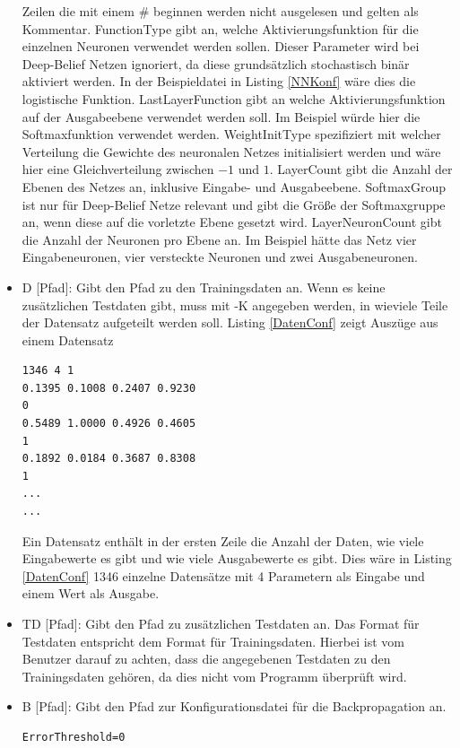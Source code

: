 \documentclass[12pt]{article}
\begin{document}
\begin{itemize}
\begin{lstlisting}[caption={Beispielkonfigurationsdatei für ein neuronales Netz},captionpos=b, label=NNKonf]
\end{lstlisting} 
Zeilen die mit einem \# beginnen werden nicht ausgelesen und gelten als Kommentar. FunctionType gibt an, welche Aktivierungsfunktion für die einzelnen Neuronen verwendet werden sollen. Dieser Parameter wird bei Deep-Belief Netzen ignoriert, da diese grundsätzlich stochastisch binär aktiviert werden. In der Beispieldatei in Listing \ref{NNKonf} wäre dies die logistische Funktion. LastLayerFunction gibt an welche Aktivierungsfunktion auf der Ausgabeebene verwendet werden soll. Im Beispiel würde hier die Softmaxfunktion verwendet werden. WeightInitType spezifiziert mit welcher Verteilung die Gewichte des neuronalen Netzes initialisiert werden und wäre hier eine Gleichverteilung zwischen $-1$ und $1$. LayerCount gibt die Anzahl der Ebenen des Netzes an, inklusive Eingabe- und Ausgabeebene. SoftmaxGroup ist nur für Deep-Belief Netze relevant und gibt die Größe der Softmaxgruppe an, wenn diese auf die vorletzte Ebene gesetzt wird. LayerNeuronCount gibt die Anzahl der Neuronen pro Ebene an. Im Beispiel hätte das Netz vier Eingabeneuronen, vier versteckte Neuronen und zwei Ausgabeneuronen.
\item D [Pfad]: Gibt den Pfad zu den Trainingsdaten an. Wenn es keine zusätzlichen Testdaten gibt, muss mit -K angegeben werden, in wieviele Teile der Datensatz aufgeteilt werden soll. Listing \ref{DatenConf} zeigt Auszüge aus einem Datensatz
\begin{lstlisting}[caption= {Auszug aus einem der verwendeten Datensätze}, captionpos=b, label={DatenConf}]
1346 4 1
0.1395 0.1008 0.2407 0.9230
0
0.5489 1.0000 0.4926 0.4605
1
0.1892 0.0184 0.3687 0.8308
1
...
...
\end{lstlisting}
Ein Datensatz enthält in der ersten Zeile die Anzahl der Daten, wie viele Eingabewerte es gibt und wie viele Ausgabewerte es gibt. Dies wäre in Listing \ref{DatenConf} 1346 einzelne Datensätze mit 4 Parametern als Eingabe und einem Wert als Ausgabe. 
\item TD [Pfad]: Gibt den Pfad zu zusätzlichen Testdaten an. Das Format für Testdaten entspricht dem Format für Trainingsdaten. Hierbei ist vom Benutzer darauf zu achten, dass die angegebenen Testdaten zu den Trainingsdaten gehören, da dies nicht vom Programm überprüft wird.
\item B [Pfad]: Gibt den Pfad zur Konfigurationsdatei für die Backpropagation an. 
\begin{lstlisting}[captionpos=b,caption={Beispielkonfiguration für den Backpropagation-Algorithmus},label={BPConf}]
ErrorThreshold=0

\end{lstlisting}
\end{itemize}
\end{document}
